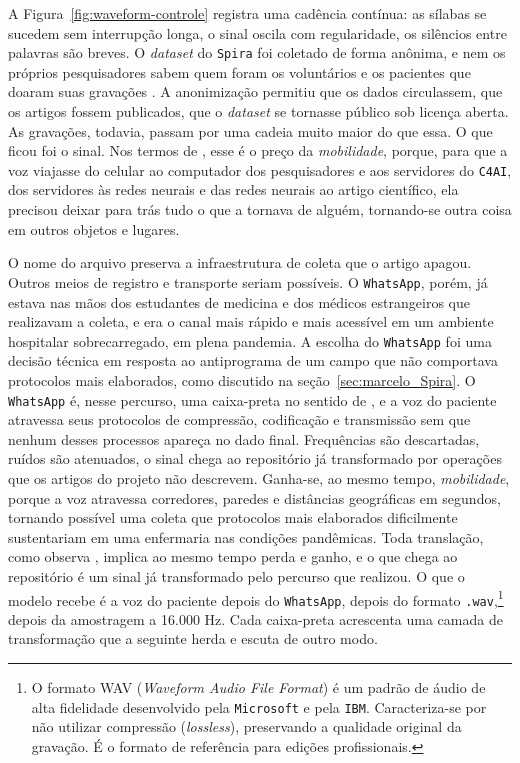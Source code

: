 A Figura~\ref{fig:waveform-controle} registra uma cadência contínua: as sílabas se sucedem sem interrupção longa, o sinal oscila com regularidade, os silêncios entre palavras são breves. O \textit{dataset} do \texttt{Spira} foi coletado de forma anônima, e nem os próprios pesquisadores sabem quem foram os voluntários e os pacientes que doaram suas gravações \parencite{Casanova2021DeepLearning}. A anonimização permitiu que os dados circulassem, que os artigos fossem publicados, que o \textit{dataset} se tornasse público sob licença aberta. As gravações, todavia, passam por uma cadeia muito maior do que essa. O que ficou foi o sinal. Nos termos de \textcite{Latour2017Esperanca}, esse é o preço da \textit{mobilidade}, porque, para que a voz viajasse do celular ao computador dos pesquisadores e aos servidores do \texttt{C4AI}, dos servidores às redes neurais e das redes neurais ao artigo científico, ela precisou deixar para trás tudo o que a tornava de alguém, tornando-se outra coisa em outros objetos e lugares.

O nome do arquivo preserva a infraestrutura de coleta que o artigo apagou. Outros meios de registro e transporte seriam possíveis. O \texttt{WhatsApp}, porém, já estava nas mãos dos estudantes de medicina e dos médicos estrangeiros que realizavam a coleta, e era o canal mais rápido e mais acessível em um ambiente hospitalar sobrecarregado, em plena pandemia. A escolha do \texttt{WhatsApp} foi uma decisão técnica em resposta ao antiprograma de um campo que não comportava protocolos mais elaborados, como discutido na seção~\ref{sec:marcelo_Spira}. O \texttt{WhatsApp} é, nesse percurso, uma caixa-preta no sentido de \textcite{Latour2011CienciaEmAcao}, e a voz do paciente atravessa seus protocolos de compressão, codificação e transmissão sem que nenhum desses processos apareça no dado final. Frequências são descartadas, ruídos são atenuados, o sinal chega ao repositório já transformado por operações que os artigos do projeto não descrevem. Ganha-se, ao mesmo tempo, \textit{mobilidade}, porque a voz atravessa corredores, paredes e distâncias geográficas em segundos, tornando possível uma coleta que protocolos mais elaborados dificilmente sustentariam em uma enfermaria nas condições pandêmicas. Toda translação, como observa \textcite{Latour2017Esperanca}, implica ao mesmo tempo perda e ganho, e o que chega ao repositório é um sinal já transformado pelo percurso que realizou. O que o modelo recebe é a voz do paciente depois do \texttt{WhatsApp}, depois do formato \texttt{.wav},\footnote{O formato WAV (\textit{Waveform Audio File Format}) é um padrão de áudio de alta fidelidade desenvolvido pela \texttt{Microsoft} e pela \texttt{IBM}. Caracteriza-se por não utilizar compressão (\textit{lossless}), preservando a qualidade original da gravação. É o formato de referência para edições profissionais.} depois da amostragem a 16.000 Hz. Cada caixa-preta acrescenta uma camada de transformação que a seguinte herda e escuta de outro modo.

